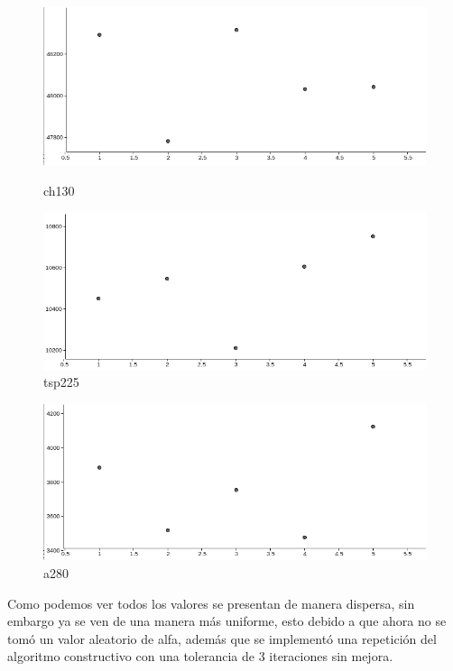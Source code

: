 \documentclass[12pt,a4paper]{article}
\begin{document}
\begin{figure}[h!t]
    \begin{minipage}[b]{0.4\linewidth}
    \centering
    \includegraphics[scale = 0.2]{ch130.png}
    \caption{ch130}
    \end{minipage}
    \hspace{0.5cm}
    \begin{minipage}[b]{0.4\linewidth}
    \centering
    \includegraphics[scale = 0.2]{tsp225.png}
    \caption{tsp225}
    \end{minipage}
\end{figure}

\begin{figure}[h!t]
\centering
\includegraphics[scale = 0.2]{a280.png}
\caption{a280}
\end{figure}

\newpage
Como podemos ver todos los valores se presentan de manera dispersa, sin embargo ya se ven de una manera más uniforme, esto debido a que ahora no se tomó un valor aleatorio de alfa, además que se implementó una repetición del algoritmo constructivo con una tolerancia de 3 iteraciones sin mejora.
\end{document}
